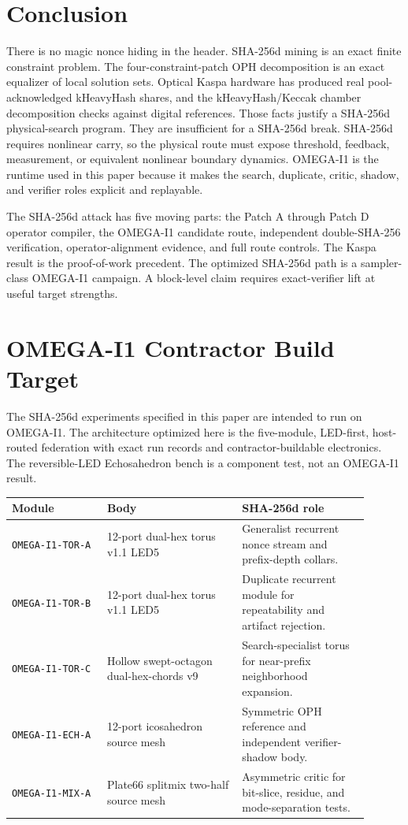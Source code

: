 \documentclass[11pt]{article}
\theoremstyle{definition}
\theoremstyle{remark}
\begin{document}
\section{Conclusion}

There is no magic nonce hiding in the header. SHA-256d mining is an exact
finite constraint problem. The four-constraint-patch OPH decomposition
is an exact equalizer of local solution sets. Optical Kaspa hardware has
produced real pool-acknowledged kHeavyHash shares, and the kHeavyHash/Keccak
chamber decomposition checks against digital references. Those facts justify a
SHA-256d physical-search program. They are insufficient for a SHA-256d break.
SHA-256d requires nonlinear carry, so the physical route must expose threshold,
feedback, measurement, or equivalent nonlinear boundary dynamics. OMEGA-I1 is
the runtime used in this paper because it makes the search, duplicate, critic,
shadow, and verifier roles explicit and replayable.

The SHA-256d attack has five moving parts: the Patch A through Patch D operator
compiler, the OMEGA-I1 candidate route, independent double-SHA-256
verification, operator-alignment evidence, and full route controls. The Kaspa
result is the proof-of-work precedent. The optimized SHA-256d path is a
sampler-class OMEGA-I1 campaign. A block-level claim requires exact-verifier
lift at useful target strengths.

\appendix

\section{OMEGA-I1 Contractor Build Target}
\label{app:omega-i1-build}

The SHA-256d experiments specified in this paper are intended to run on
OMEGA-I1. The architecture optimized here is the five-module, LED-first,
host-routed federation with exact run records and contractor-buildable
electronics. The reversible-LED Echosahedron bench is a component test, not an
OMEGA-I1 result.

\begin{center}
\small
\begin{tabular}{L{0.24\linewidth}L{0.34\linewidth}L{0.32\linewidth}}
\toprule
Module & Body & SHA-256d role\\
\midrule
\texttt{OMEGA-I1-TOR-A} & 12-port dual-hex torus v1.1 LED5 &
Generalist recurrent nonce stream and prefix-depth collars.\\
\texttt{OMEGA-I1-TOR-B} & 12-port dual-hex torus v1.1 LED5 &
Duplicate recurrent module for repeatability and artifact rejection.\\
\texttt{OMEGA-I1-TOR-C} & Hollow swept-octagon dual-hex-chords v9 &
Search-specialist torus for near-prefix neighborhood expansion.\\
\texttt{OMEGA-I1-ECH-A} & 12-port icosahedron source mesh &
Symmetric OPH reference and independent verifier-shadow body.\\
\texttt{OMEGA-I1-MIX-A} & Plate66 splitmix two-half source mesh &
Asymmetric critic for bit-slice, residue, and mode-separation tests.\\
\bottomrule
\end{tabular}
\end{center}
\end{document}
